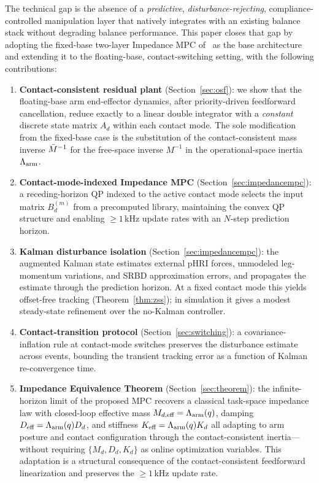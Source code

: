 The technical gap is the absence of a \emph{predictive},
\emph{disturbance-rejecting}, compliance-controlled manipulation layer that
natively integrates with an existing balance stack without degrading balance
performance. This paper closes that gap by adopting the fixed-base
two-layer Impedance MPC of~\cite{cao2026impedance} as the base architecture
and extending it to the floating-base, contact-switching setting, with the
following contributions:

\begin{enumerate}
\item \textbf{Contact-consistent residual plant} (Section~\ref{sec:osf}):
we show that the floating-base arm end-effector dynamics, after
priority-driven feedforward cancellation, reduce exactly to a linear double
integrator with a \emph{constant} discrete state matrix $A_d$ within each
contact mode. The sole modification from the fixed-base case is the
substitution of the contact-consistent mass inverse $\bar{M}^{-1}$ for the
free-space inverse $M^{-1}$ in the operational-space inertia $\Lambda_{\text{arm}}$.

\item \textbf{Contact-mode-indexed Impedance MPC}
(Section~\ref{sec:impedancempc}): a receding-horizon QP indexed to the
active contact mode selects the input matrix $B_d^{(m)}$ from a
precomputed library, maintaining the convex QP structure and enabling
${\geq}1$\,kHz update rates with an $N$-step prediction horizon.

\item \textbf{Kalman disturbance isolation}
(Section~\ref{sec:impedancempc}): the augmented Kalman state estimates external
pHRI forces, unmodeled leg-momentum variations, and SRBD approximation errors,
and propagates the estimate through the prediction horizon. At a fixed contact
mode this yields offset-free tracking (Theorem~\ref{thm:zss}); in simulation it
gives a modest steady-state refinement over the no-Kalman controller.

\item \textbf{Contact-transition protocol} (Section~\ref{sec:switching}):
a covariance-inflation rule at contact-mode switches preserves the
disturbance estimate across events, bounding the transient tracking error
as a function of Kalman re-convergence time.

\item \textbf{Impedance Equivalence Theorem} (Section~\ref{sec:theorem}):
the infinite-horizon limit of the proposed MPC recovers a classical
task-space impedance law with closed-loop effective mass
$M_{d,\text{eff}}=\Lambda_{\text{arm}}(q)$, damping $D_{\text{eff}}=\Lambda_{\text{arm}}(q)D_d$, and
stiffness $K_{\text{eff}}=\Lambda_{\text{arm}}(q)K_d$ all adapting to arm posture and
contact configuration through the contact-consistent inertia---without
requiring $\{M_d,D_d,K_d\}$ as online optimization variables. This
adaptation is a structural consequence of the contact-consistent feedforward
linearization and preserves the ${\geq}1$\,kHz update rate.


\end{enumerate}
